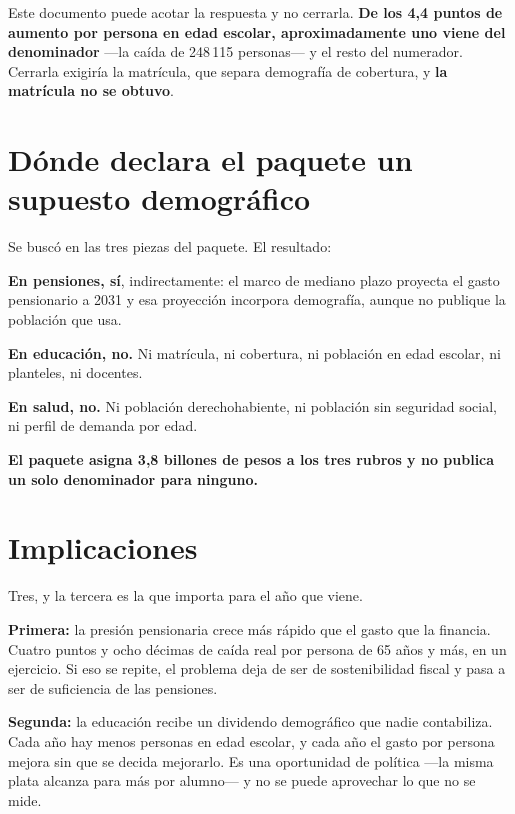 Este documento puede acotar la respuesta y no cerrarla. \textbf{De los 4,4 puntos de aumento
por persona en edad escolar, aproximadamente uno viene del denominador} ---la caída de
248\,115 personas--- y el resto del numerador. Cerrarla exigiría la matrícula, que separa
demografía de cobertura, y \textbf{la matrícula no se obtuvo}.

\section{Dónde declara el paquete un supuesto demográfico}

Se buscó en las tres piezas del paquete. El resultado:

\begin{list}{}{\setlength{\leftmargin}{1.4em}\setlength{\itemsep}{2pt}}
\item[$\bullet$] \textbf{En pensiones, sí}, indirectamente: el marco de mediano plazo proyecta
el gasto pensionario a 2031 y esa proyección incorpora demografía, aunque no publique la
población que usa.
\item[$\bullet$] \textbf{En educación, no.} Ni matrícula, ni cobertura, ni población en edad
escolar, ni planteles, ni docentes.
\item[$\bullet$] \textbf{En salud, no.} Ni población derechohabiente, ni población sin
seguridad social, ni perfil de demanda por edad.
\end{list}

\textbf{El paquete asigna 3,8 billones de pesos a los tres rubros y no publica un solo
denominador para ninguno.}

\section{Implicaciones}

Tres, y la tercera es la que importa para el año que viene.

\textbf{Primera:} la presión pensionaria crece más rápido que el gasto que la financia. Cuatro
puntos y ocho décimas de caída real por persona de 65 años y más, en un ejercicio. Si eso se
repite, el problema deja de ser de sostenibilidad fiscal y pasa a ser de suficiencia de las
pensiones.

\textbf{Segunda:} la educación recibe un dividendo demográfico que nadie contabiliza. Cada año
hay menos personas en edad escolar, y cada año el gasto por persona mejora sin que se decida
mejorarlo. Es una oportunidad de política ---la misma plata alcanza para más por alumno--- y no
se puede aprovechar lo que no se mide.

